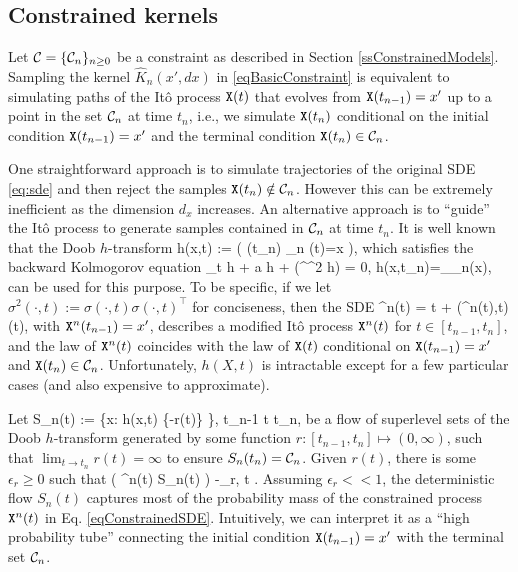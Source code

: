 \documentclass[onefignum,onetabnum]{siamonline250211}%
\begin{document}
%
\subsection{Constrained kernels} \label{ssDoob}

Let ${\mathcal C} = \{ {\mathcal C}_n \}_{n \ge 0}$ be a constraint as described in Section \ref{ssConstrainedModels}. Sampling the kernel $\hat K_n(x',dx)$ in \eqref{eqBasicConstraint} is equivalent to simulating paths of the It\^o process $\mathtt{X}(t)$ that evolves from $\mathtt{X}(t_{n-1})=x'$ up to a point in the set ${\mathcal C}_n$ at time $t_n$, i.e., we simulate $\mathtt{X}(t_n)$ conditional on the initial condition $\mathtt{X}(t_{n-1})=x'$ and the terminal condition $\mathtt{X}(t_n) \in {\mathcal C}_n$.

One straightforward approach is to simulate trajectories of the original SDE \eqref{eq:sde} and then reject the samples $\mathtt{X}(t_n) \notin {\mathcal C}_n$. However this can be extremely inefficient as the dimension $d_x$ increases. An alternative approach is to ``guide'' the It\^o process to generate samples contained in ${\mathcal C}_n$ at time $t_n$. It is well known that the Doob $h$-transform \cite{Rogers00}
\beq
h(x,t) := \mbP\left( \X(t_n) \in \mC_n \mid \X(t)=x \right),
\nn
\eeq
which satisfies the backward Kolmogorov equation
\beq
\partial_t h + a \cdot \nabla h + (\sigma\sigma^\top\nabla^2 h) = 0, \qquad h(x,t_n)=\Ind_{\mC_n}(x),
\nn
\eeq
can be used for this purpose. To be specific, if we let $\sigma^2(\cdot,t):=\sigma(\cdot,t)\sigma(\cdot,t)^\top$ for conciseness, then the SDE
\beq
\sd \X^n(t) =  \sd t + \sigma(\X^n(t),t)\sd \W(t),
\label{eqConstrainedSDE}
\eeq
with $\mathtt{X}^n(t_{n-1})=x'$, describes a modified It\^o process $\mathtt{X}^n(t)$ for $t \in [t_{n-1}, t_n]$, and the law of $\mathtt{X}^n(t)$ coincides with the law of $\mathtt{X}(t)$ conditional on $\mathtt{X}(t_{n-1})=x'$ and $\mathtt{X}(t_n)\in{\mathcal C}_n$. Unfortunately, $h(X,t)$ is  intractable except for a few particular cases (and also expensive to approximate). 

Let
\beq
S_n(t) := \left\{x\in\mX : h(x,t) \ge \exp\{-r(t)\} \right\},
\quad t_{n-1} \le t \le t_n,
\nn
\eeq
be a flow of superlevel sets of the Doob $h$-transform generated by some function $r:[t_{n-1},t_n] \mapsto (0,\infty)$, such that $\lim_{t\to t_n} r(t) = \infty$ to ensure $S_n(t_n) = {\mathcal C}_n$. Given $r(t)$, there is some $\epsilon_r \ge 0$ such that
\beq
\mbP\left( \X^n(t) \in S_n(t) \right) -\epsilon_r, \quad \forall t \in [t_{n-1}, t_n].
\nn
\eeq
Assuming $\epsilon_r<<1$, the deterministic flow $S_n(t)$ captures most of the probability mass of the constrained process $\mathtt{X}^n(t)$ in Eq. \eqref{eqConstrainedSDE}. Intuitively, we can interpret it as a ``high probability tube'' connecting the initial condition $\mathtt{X}(t_{n-1})=x'$ with the terminal set ${\mathcal C}_n$. %
\end{document}
